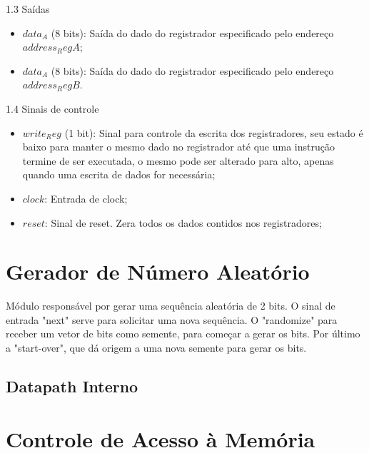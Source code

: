 \documentclass{report}
\begin{document}
1.3	Saídas
\begin{itemize}
\item $data_A$ (8 bits): Saída do dado do registrador especificado pelo endereço $address_RegA$;
\item $data_A$ (8 bits): Saída do dado do registrador especificado pelo endereço $address_RegB$.
\end{itemize}

1.4	Sinais de controle
\begin{itemize}
\item $write_Reg$ (1 bit): Sinal para controle da escrita dos registradores, seu estado é baixo para manter o mesmo dado no registrador até que uma instrução termine de ser executada, o mesmo pode ser alterado para alto, apenas quando uma escrita de dados for necessária;
\item $clock$: Entrada de clock;
\item $reset$: Sinal de reset. Zera todos os dados contidos nos registradores;
\end{itemize}
  
    
 
    \section{Gerador de Número Aleatório}
  Módulo responsável por gerar uma sequência aleatória de 2 bits. O sinal de entrada "next" serve para solicitar uma nova sequência. O "randomize" para receber um vetor de bits como semente, para começar a gerar os bits. Por último a "start-over", que dá origem a uma nova semente para gerar os bits.
  
    \subsection{Datapath Interno}
    \paragraph{}
    
    
   
  \section{Controle de Acesso à Memória}
  
\end{document}
